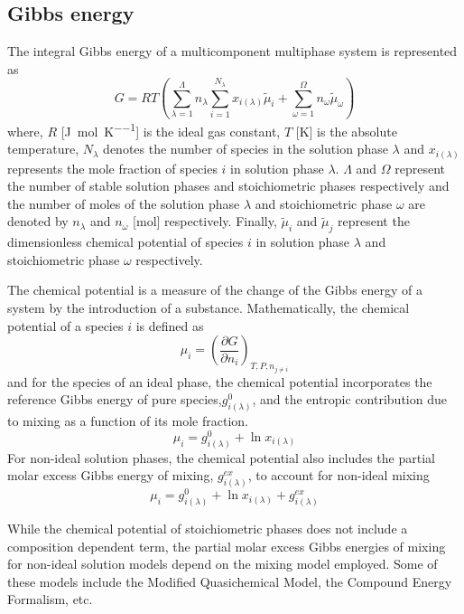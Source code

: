 \subsection*{Gibbs energy}
    The integral Gibbs energy of a multicomponent multiphase system is represented as
    \begin{equation*}
        G = RT \left ( \sum_{\lambda=1}^{\Lambda} n_{\lambda} \sum_{i=1}^{N_{\lambda}}x_{i({\lambda})}\tilde{\mu}_i + \sum_{\omega=1}^{\Omega} n_{\omega} \tilde{\mu}_{\omega} \right )
    \end{equation*}
    where, $R$ [\si{\joule \per \mole \per \kelvin}] is the ideal gas constant, $T$ [\si{\kelvin}] is the absolute temperature, $N_{\lambda}$ denotes the number of species in the solution phase $\lambda$ and $x_{i({\lambda})}$ represents the mole fraction of species $i$ in solution phase $\lambda$. $\Lambda$ and $\Omega$ represent the number of stable solution phases and stoichiometric phases respectively and the number of moles of the solution phase $\lambda$ and stoichiometric phase $\omega$ are denoted by $n_\lambda$ and $n_\omega$ [\si{\mole}] respectively. Finally, $\tilde{\mu}_i$ and $\tilde{\mu}_j$ represent the dimensionless chemical potential of species $i$ in solution phase $\lambda$ and stoichiometric phase $\omega$ respectively. 
    
    The chemical potential is a measure of the change of the Gibbs energy of a system by the introduction of a substance. Mathematically, the chemical potential of a species $i$ is defined as 
    \begin{equation*}
        \mu_i = {\left (\frac{\partial G}{\partial n_i} \right )}_{T,P,n_{j \neq i}}
    \end{equation*}
    and for the species of an ideal phase, the chemical potential incorporates the reference Gibbs energy of pure species,$g_{i(\lambda)}^0$, and the entropic contribution due to mixing as a function of its mole fraction.
    \begin{equation*}
        \mu_i = g_{i(\lambda)}^0 + \ln x_{i(\lambda)}
    \end{equation*}
    For non-ideal solution phases, the chemical potential also includes the partial molar excess  Gibbs energy of mixing, $g_{i(\lambda)}^{ex}$, to account for non-ideal mixing
    \begin{equation*}
        \mu_i = g_{i(\lambda)}^0 + \ln x_{i(\lambda)} + g_{i(\lambda)}^{ex}
    \end{equation*}
    
    While the chemical potential of stoichiometric phases does not include a composition dependent term, the partial molar excess Gibbs energies of mixing for non-ideal solution models depend on the mixing model employed. Some of these models include the Modified Quasichemical Model, the Compound Energy Formalism, etc.

